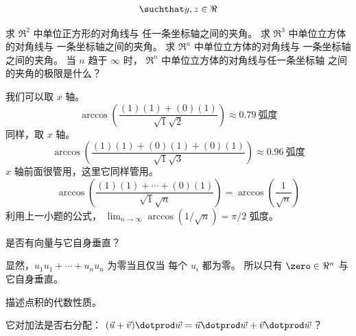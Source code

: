 \begin{exercises}
\begin{answer}
\begin{equation*}
{               \suchthat y,z\in\Re}
      \end{equation*}  
    \end{answer}
  \recommended \item
    \begin{exparts}
      \partsitem  求 \( \Re^2 \) 中单位正方形的对角线与
        任一条坐标轴之间的夹角。
      \partsitem  求 \( \Re^3 \) 中单位立方体的对角线与
        一条坐标轴之间的夹角。
      \partsitem  求 \( \Re^n \) 中单位立方体的对角线与
        一条坐标轴之间的夹角。
      \partsitem  当 \( n \) 趋于 \( \infty \) 时，
        \( \Re^n \) 中单位立方体的对角线与任一条坐标轴
        之间的夹角的极限是什么？
    \end{exparts}
    \begin{answer}
      \begin{exparts}
        \partsitem 我们可以取 \( x \) 轴。
          \begin{equation*}
            \arccos (\frac{(1)(1)+(0)(1)}{\sqrt{1}\sqrt{2}})
            \approx 0.79~\text{弧度}
          \end{equation*}
        \partsitem 同样，取 \( x \) 轴。
          \begin{equation*}
            \arccos (\frac{(1)(1)+(0)(1)+(0)(1)}{\sqrt{1}\sqrt{3}})
            \approx 0.96~\text{弧度}
          \end{equation*}
        \partsitem \( x \) 轴前面很管用，这里它同样管用。
          \begin{equation*}
            \arccos (\frac{(1)(1)+\cdots+(0)(1)}{\sqrt{1}\sqrt{n}})
            =\arccos (\frac{1}{\sqrt{n}})
          \end{equation*}
        \partsitem 利用上一小题的公式，
            $\lim_{n\to\infty} \arccos(1/\sqrt{n})
              =\pi/2\text{\ 弧度}$。
      \end{exparts}  
    \end{answer}
  \item  
    是否有向量与它自身垂直？
    \begin{answer}
      显然，\( u_1u_1+\cdots+u_nu_n \) 为零当且仅当
      每个 \( u_i \) 都为零。
      所以只有 \( \zero\in\Re^n \) 与它自身垂直。  
    \end{answer}
  \item \label{exer:AlgPropsDotProd}  
    描述点积的代数性质。
    \begin{exparts}
      \partsitem 它对加法是否右分配：
        \(
           (\vec{u}+\vec{v})\dotprod\vec{w}
           =
           \vec{u}\dotprod\vec{w}+\vec{v}\dotprod\vec{w} \)？

\end{exparts}
\end{exercises}

